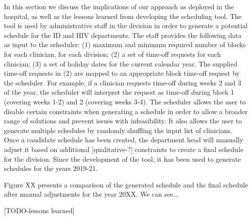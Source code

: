 In this section we discuss the implications of our approach as deployed in the hospital,
as well as the lessons learned from developing the scheduling tool.
The tool is used by administrative staff in the division in order to generate a potential schedule
for the ID and HIV departments. 
The staff provides the following data as input to the scheduler:
(1) maximum and minimum required number of blocks for each clinician, for each division;
(2) a set of time-off requests for each clinician;
(3) a set of holiday dates for the current calendar year.
The supplied time-off requests in (2) are mapped to an appropriate block time-off request by the scheduler.
For example, if a clinician requests time-off during weeks 2 and 3 of the year, the scheduler
will interpret the request as time-off during block 1 (covering weeks 1-2) and 2 (covering weeks 3-4).
The scheduler allows the user to disable certain constraints when generating a schedule
in order to allow a broader range of solutions and prevent issues with infeasibility. 
It also allows the user to generate multiple schedules by randomly shuffling the input list of clinicians.
Once a candidate schedule has been created, the department head will manually adjust it based on
additional [qualitative-?] constraints to create a final schedule for the division.
Since the development of the tool, it has been used to generate schedules for the years 2019-21.

Figure XX presents a comparison of the generated schedule and the final schedule after manual adjustments
for the year 20XX. We can see...

[TODO-lessons learned]